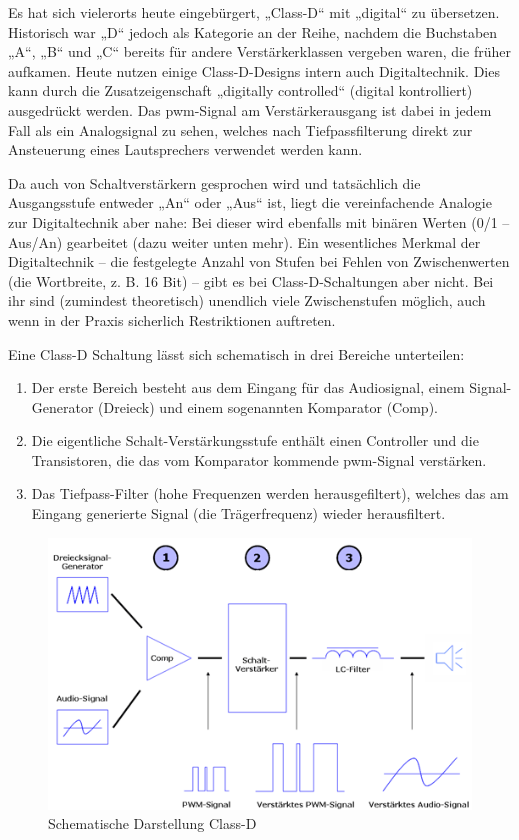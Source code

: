 Es hat sich vielerorts heute eingebürgert, „Class-D“ mit „digital“ zu übersetzen. Historisch war „D“ jedoch als Kategorie an der Reihe, nachdem die Buchstaben „A“, „B“ und „C“ bereits für andere Verstärkerklassen vergeben waren, die früher aufkamen. Heute nutzen einige Class-D-Designs intern auch Digitaltechnik. Dies kann durch die Zusatzeigenschaft „digitally controlled“ (digital kontrolliert) ausgedrückt werden. Das \ac{pwm}-Signal am Verstärkerausgang ist dabei in jedem Fall als ein Analogsignal zu sehen, welches nach Tiefpassfilterung direkt zur Ansteuerung eines Lautsprechers verwendet werden kann. \cite{fairaudio-classd}\par

Da auch von Schaltverstärkern gesprochen wird und tatsächlich die Ausgangsstufe entweder „An“ oder „Aus“ ist, liegt die vereinfachende Analogie zur Digitaltechnik aber nahe: Bei dieser wird ebenfalls mit binären Werten (0/1 – Aus/An) gearbeitet (dazu weiter unten mehr). Ein wesentliches Merkmal der Digitaltechnik – die festgelegte Anzahl von Stufen bei Fehlen von Zwischenwerten (die Wortbreite, z. B. 16 Bit) – gibt es bei Class-D-Schaltungen aber nicht. Bei ihr sind (zumindest theoretisch) unendlich viele Zwischenstufen möglich, auch wenn in der Praxis sicherlich Restriktionen auftreten. \cite{fairaudio-classd}\par

Eine Class-D Schaltung lässt sich schematisch in drei Bereiche unterteilen:
\begin{enumerate}
	\item Der erste Bereich besteht aus dem Eingang für das Audiosignal, einem Signal-Generator (Dreieck) und einem sogenannten Komparator (Comp).
	\item Die eigentliche Schalt-Verstärkungsstufe enthält einen Controller und die Transistoren, die das vom Komparator kommende \ac{pwm}-Signal verstärken.
	\item Das Tiefpass-Filter (hohe Frequenzen werden herausgefiltert), welches das am Eingang generierte Signal (die Trägerfrequenz) wieder herausfiltert.	
\end{enumerate}
\cite{fairaudio-classd}
\begin{figure}[H]
	\centering
	\includegraphics[width=.9\linewidth]{images/technische_grundlagen/class-d-schematisch.png}
	\caption{Schematische Darstellung Class-D \cite{fairaudio-classd}}
\end{figure}
